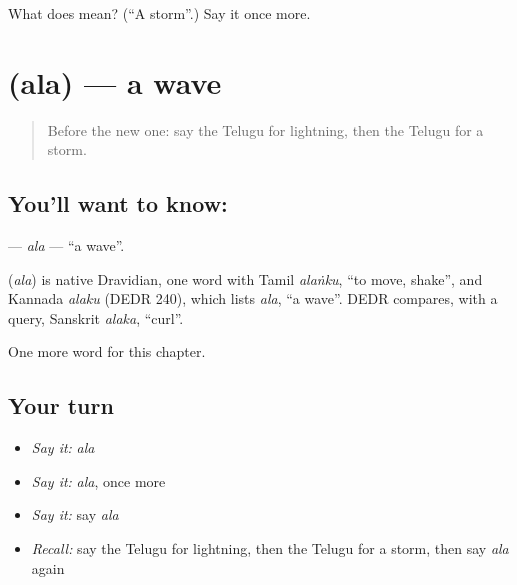 \begin{tcolorbox}[breakable,colback=teal!4,colframe=teal!35!black,title={Before you move on}]
What does  mean? (\textquotedblleft{}A storm\textquotedblright{}.) Say it once more.
\end{tcolorbox}
\section[\texorpdfstring{\te{అల} (ala)}{అల (ala)}]{ (ala) — a wave}

\label{lesson:TE-C121-ala}



\begin{quote}
Before the new one: say the Telugu for lightning, then the Telugu for a storm.
\end{quote}

\subsection*{You'll want to know: }
\textbf{} — \emph{ala} — \textquotedblleft{}a wave\textquotedblright{}.

\begin{cousinweb}
\textbf{} (\emph{ala}) is native Dravidian, one word with Tamil \emph{alaṅku}, \textquotedblleft{}to move, shake\textquotedblright{}, and Kannada \emph{alaku} (DEDR 240), which lists \emph{ala}, \textquotedblleft{}a wave\textquotedblright{}. DEDR compares, with a query, Sanskrit \emph{alaka}, \textquotedblleft{}curl\textquotedblright{}.
\end{cousinweb}

\begin{grammarlens}[title={What you've built}]
One more word for this chapter.
\end{grammarlens}

\subsection*{Your turn}
\begin{itemize}
\raggedright
  \item \emph{Say it:} \emph{ala}
  \item \emph{Say it:} \emph{ala}, once more
  \item \emph{Say it:} say \emph{ala}
  \item \emph{Recall:} say the Telugu for lightning, then the Telugu for a storm, then say \emph{ala} again
\end{itemize}

